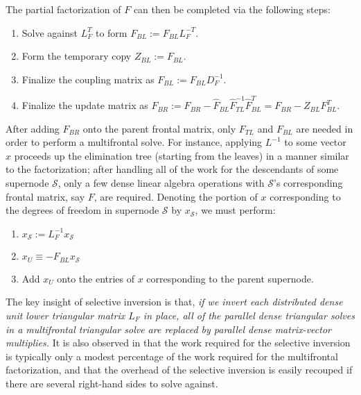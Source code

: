 The partial factorization of $F$ can then be completed via the following steps:
\begin{enumerate}
\item Solve against $L_F^T$ to form $F_{BL} := F_{BL} L_F^{-T}$.
\item Form the temporary copy $Z_{BL} := F_{BL}$.
\item Finalize the coupling matrix as $F_{BL} := F_{BL} D_F^{-1}$.
\item Finalize the update matrix as 
$F_{BR} := F_{BR} - \hat F_{BL} \hat F_{TL}^{-1} \hat F_{BL}^T 
         = F_{BR} - Z_{BL} F_{BL}^T$.
\end{enumerate}
After adding $F_{BR}$ onto the parent frontal matrix, only $F_{TL}$ and $F_{BL}$
are needed in order to perform a multifrontal solve. For instance, applying
$L^{-1}$ to some vector $x$ proceeds up the elimination tree 
(starting from the leaves) in a manner similar to the factorization;
after handling all of the work for the descendants of some supernode 
$\mathcal{S}$, only a few dense linear algebra operations with $\mathcal{S}$'s 
corresponding frontal matrix, say $F$, are required.
Denoting the portion of $x$ corresponding to the degrees of freedom in 
supernode $\mathcal{S}$ by $x_{\mathcal{S}}$, we must perform:
\begin{enumerate}
\item $x_{\mathcal{S}} := L_F^{-1} x_{\mathcal{S}}$
\item $x_U \equiv -F_{BL} x_{\mathcal{S}}$
\item Add $x_U$ onto the entries of $x$ corresponding to the parent supernode.
\end{enumerate}
The key insight of selective inversion is that, 
{\em if we invert each distributed dense unit lower triangular matrix $L_F$ in 
place, all of the parallel dense triangular solves in a multifrontal 
triangular solve are replaced by parallel dense matrix-vector multiplies.} It 
is also observed in \cite{Raghavan-invert} that the work required for the 
selective inversion is typically only a modest percentage of the work required 
for the multifrontal factorization, and that the overhead of the selective 
inversion is easily recouped if there are several right-hand sides to solve 
against.

